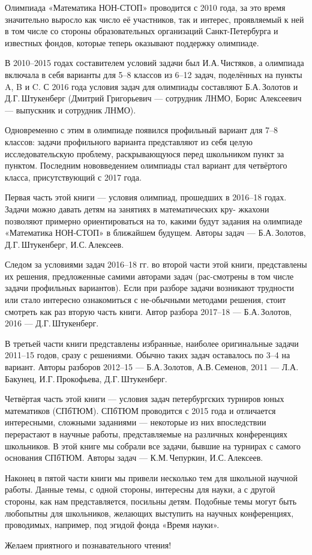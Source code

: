 \noindent\abz Олимпиада «Математика НОН-СТОП» проводится с 2010 года, за это время значительно выросло как число её участников, так и интерес, проявляемый к ней в том числе со стороны образовательных организаций Санкт-Петербурга и известных фондов, которые теперь оказывают поддержку олимпиаде.

\aabz В 2010–2015 годах составителем условий задачи был И.А.\,Чистяков, а олимпиада включала в себя варианты для 5–8 классов из 6–12 задач, поделённых на пункты A, B и C. С 2016 года условия задач для олимпиады составляют Б.А.\,Золотов и Д.Г.\,Штукенберг (Дмитрий Григорьевич — сотрудник ЛНМО, Борис Алексеевич — выпускник и сотрудник ЛНМО).

\aabz Одновременно с этим в олимпиаде появился профильный вариант для 7–8 классов: задачи профильного варианта представляют из себя целую исследовательскую проблему, раскрывающуюся перед школьником пункт за пунктом. Последним нововведением олимпиады стал вариант для четвёртого класса, присутствующий с 2017 года.

\aabz Первая часть этой книги — условия олимпиад, прошедших в 2016–18 годах. Задачи можно давать детям на занятиях в математических кру- жках\scolon они позволяют примерно ориентироваться на то, какими будут задания на олимпиаде «Математика НОН-СТОП» в ближайшем будущем. Авторы задач — Б.А.\,Золотов, Д.Г.\,Штукенберг, И.С.\,Алексеев.

\aabz Следом за условиями задач 2016–18 гг. во второй части этой книги, представлены их решения, предложенные самими авторами задач (рас-\linebreak смотрены в том числе задачи профильных вариантов). Если при разборе задачи возникают трудности или стало интересно ознакомиться с не-\linebreak обычными методами решения, стоит смотреть как раз вторую часть книги. Автор разбора 2017–18 — Б.А.\,Золотов, 2016 — Д.Г.\,Штукенберг.

\aabz В третьей части книги представлены избранные, наиболее оригинальные задачи 2011–15 годов, сразу с решениями. Обычно таких задач оставалось по 3–4 на вариант. Авторы разборов 2012–15 — Б.А.\,Золотов, А.В.\,Семенов, 2011 — Л.А.\,Бакунец, И.Г.\,Прокофьева, Д.Г.\,Штукенберг.

\aabz Четвёртая часть этой книги — условия задач петербургских турниров юных математиков (СПбТЮМ). СПбТЮМ проводится с 2015 года и отличается интересными, сложными заданиями — некоторые из них впоследствии перерастают в научные работы, представляемые на различных конференциях школьников. В этой книге мы собрали все задачи, бывшие на турнирах с самого основания СПбТЮМ. Авторы задач — К.М.\,Чепуркин, И.С.\,Алексеев.

\thispagestyle{empty}

\aabz Наконец в пятой части книги мы привели несколько тем для школьной научной работы. Данные темы, с одной стороны, интересны для науки, а с другой стороны, как нам представляется, посильны детям. Подобные темы могут быть любопытны для школьников, желающих выступить на научных конференциях, проводимых, например, под эгидой фонда «Время науки».

\aabz Желаем приятного и познавательного чтения!

